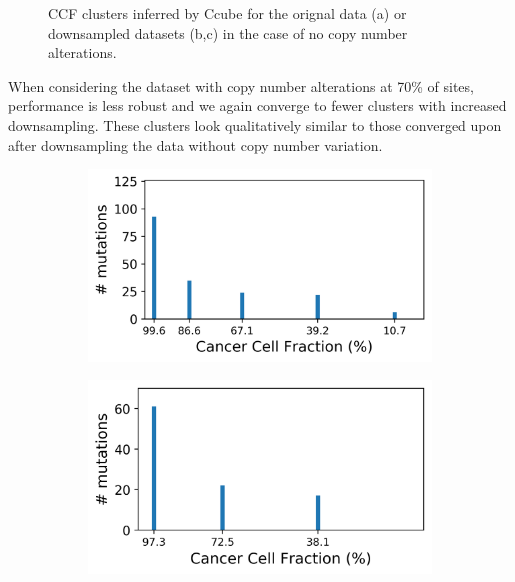 \documentclass{article}
\begin{document}
\begin{figure}[h]
\begin{subfigure}[t]{0.32\linewidth}
	\end{subfigure}%
\caption{CCF clusters inferred by Ccube for the orignal data (a) or downsampled datasets (b,c) in the case of no copy number alterations.}
\label{fig:CN0}
\end{figure}

When considering the dataset with copy number alterations at 70\% of sites, performance is less robust and we again converge to fewer clusters with increased downsampling. These clusters look qualitatively similar to those converged upon after downsampling the data without copy number variation.

\begin{figure}[h]
	\centering
	\begin{subfigure}[t]{0.32\linewidth}
		\centering
		\includegraphics[width = 1.0\linewidth, trim={0 0 0 0}, clip=true]{ccube_analysis_0_7CN/cols.png}
	\end{subfigure}%
	\hspace{0.01 \linewidth}
	\begin{subfigure}[t]{0.32\linewidth}
		\centering
		\includegraphics[width = 1.0\linewidth, trim={0 0 0 0}, clip=true]{ccube_analysis_7CN_100/cols.png}

\end{subfigure}
\end{figure}
\end{document}
